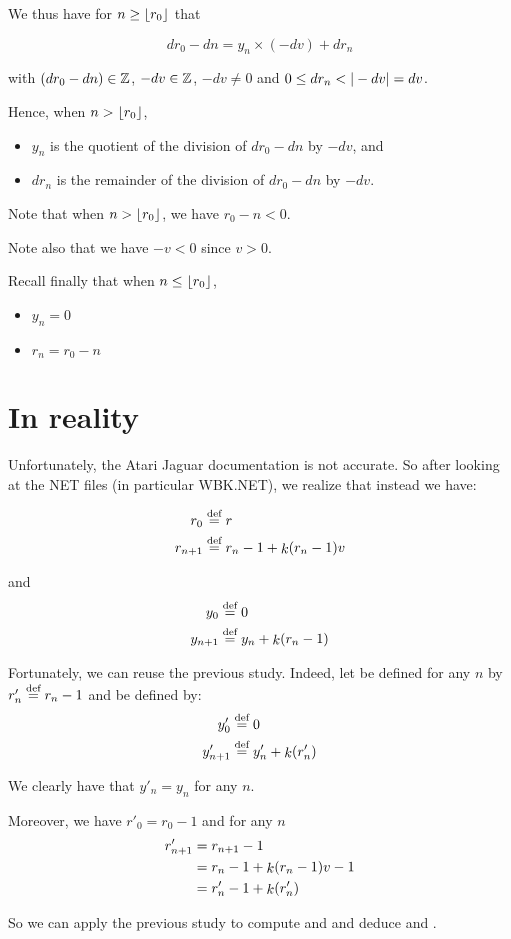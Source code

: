 \bigskip

We thus have for $n \geq \lfloor r_0 \rfloor$ that

$$d r_0 - d n = y_n \times (- d v) + d r_n$$

with $(d r_0 - d n) \in \mathbb{Z}$, $- d v \in \mathbb{Z}$, $- d v \neq 0$ and $0 \leq
d r_n < | - d v | = d v$.

\smallskip 

Hence, when $n > \lfloor r_0 \rfloor$,
\begin{itemize}
\item $y_n$ is the quotient of the division of $d r_0 - d n$ by $- d
  v$, and
\item $d r_n$ is the remainder of the division of $d r_0 - d n$ by $- d
  v$.
\end{itemize}

Note that when $n > \lfloor r_0 \rfloor$, we have $r_0 - n < 0$. 

Note also that we have $- v < 0$ since $v > 0$.

\smallskip

Recall finally that when $n \leq \lfloor r_0 \rfloor$,
\begin{itemize}
\item $y_n = 0$
\item $r_n = r_0 - n$
\end{itemize}

\section{In reality}
Unfortunately, the Atari Jaguar documentation is not accurate. So
after looking at the NET files (in particular WBK.NET), we realize
that instead we have:

\begin{align*}
  r_0 & \stackrel{\text{def}}{=} r \\
  r_{n+1} & \stackrel{\text{def}}{=} r_n - 1 + \mathop{k}(r_n - 1) v 
\end{align*}

and
\begin{align*}
  y_0 & \stackrel{\text{def}}{=} 0 \\
  y_{n+1} & \stackrel{\text{def}}{=} y_n + \mathop{k}(r_n - 1)
\end{align*}


Fortunately, we can reuse the previous study. Indeed, let 
be defined for any $n$ by $r'_n \stackrel{\text{def}}{=} r_n - 1$ and  be
defined by:
\begin{align*}
  y'_0 & \stackrel{\text{def}}{=} 0 \\
  y'_{n+1} & \stackrel{\text{def}}{=} y'_n + \mathop{k}(r'_n)
\end{align*}

We clearly have that $y'_n = y_n$ for any $n$.

Moreover, we have $r'_0 = r_0 - 1$ and for any $n$
\begin{align*}
  r'_{n+1} & = r_{n+1} - 1 \\
  & = r_n - 1 + \mathop{k}(r_n - 1) v - 1 \\
  & = r'_n - 1 + \mathop{k}(r'_n)
\end{align*}

So we can apply the previous study to compute  and
 and deduce  and .


